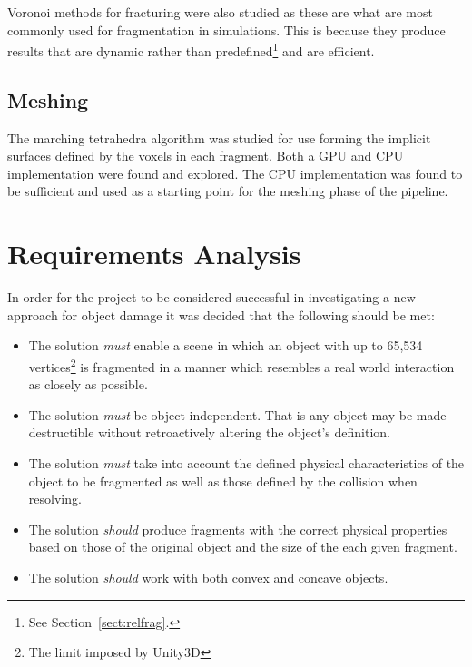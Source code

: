 Voronoi methods for fracturing were also studied as these are what are most commonly used for fragmentation in simulations. This is because they produce results that are dynamic rather than predefined\footnote{See Section~\ref{sect:relfrag}.} and are efficient\cite{Muller:2013:RTD:2461912.2461934}.

\subsection{Meshing}

The marching tetrahedra algorithm was studied for use forming the implicit surfaces defined by the voxels in each fragment. Both a GPU and CPU implementation were found and explored. The CPU implementation was found to be sufficient and used as a starting point for the meshing phase of the pipeline\cite{Tetrahedra-CPU}.

\section{Requirements Analysis}

\label{sect:req}

In order for the project to be considered successful in investigating a new approach for object damage it was decided that the following should be met:

\begin{itemize}
\item{The solution \emph{must} enable a scene in which an object with up to 65,534 vertices\footnote{The limit imposed by Unity3D} is fragmented in a manner which resembles a real world interaction as closely as possible.}
\item{The solution \emph{must} be object independent. That is any object may be made destructible without retroactively altering the object's definition.}
\item{The solution \emph{must} take into account the defined physical characteristics of the object to be fragmented as well as those defined by the collision when resolving.}
\end{itemize}

\begin{itemize}
\item{The solution \emph{should} produce fragments with the correct physical properties based on those of the original object and the size of the each given fragment.}
\item{The solution \emph{should} work with both convex and concave objects.}
\end{itemize}

